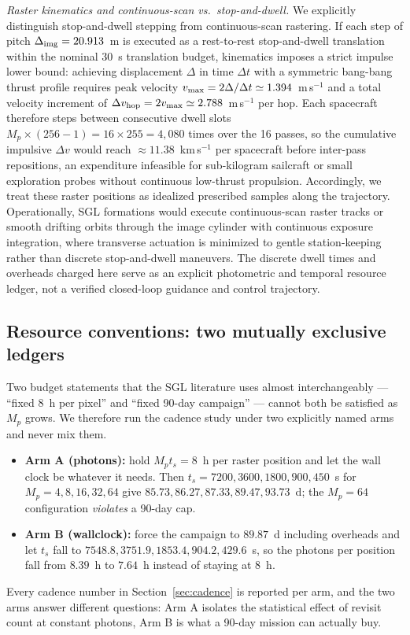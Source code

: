 \documentclass[twocolumn,10pt]{article}
\begin{document}
\emph{Raster kinematics and continuous-scan vs.\ stop-and-dwell.} We explicitly distinguish stop-and-dwell stepping from continuous-scan rastering. If each step of pitch $\Delta_{\rm img} = 20.913$~m is executed as a rest-to-rest stop-and-dwell translation within the nominal 30~s translation budget, kinematics imposes a strict impulse lower bound: achieving displacement $\Delta$ in time $\Delta t$ with a symmetric bang-bang thrust profile requires peak velocity $v_{\rm max} = 2\Delta/\Delta t \simeq 1.394$~m\,s$^{-1}$ and a total velocity increment of $\Delta v_{\rm hop} = 2 v_{\rm max} \simeq 2.788$~m\,s$^{-1}$ per hop. Each spacecraft therefore steps between consecutive dwell slots
$M_p\times(256-1)=16\times255=4{,}080$ times over the 16 passes, so the cumulative impulsive $\Delta v$ would reach $\approx 11.38$~km\,s$^{-1}$ per spacecraft before inter-pass repositions, an expenditure infeasible for sub-kilogram sailcraft or small exploration probes without continuous low-thrust propulsion. Accordingly, we treat these raster positions as idealized prescribed samples along the trajectory. Operationally, SGL formations would execute continuous-scan raster tracks or smooth drifting orbits through the image cylinder with continuous exposure integration, where transverse actuation is minimized to gentle station-keeping rather than discrete stop-and-dwell maneuvers. The discrete dwell times and overheads charged here serve as an explicit photometric and temporal resource ledger, not a verified closed-loop guidance and control trajectory.

\subsection{Resource conventions: two mutually exclusive ledgers}
\label{sec:ledger}
Two budget statements that the SGL literature uses almost interchangeably ---
``fixed 8~h per pixel'' and ``fixed 90-day campaign'' --- cannot both be
satisfied as $M_p$ grows. We therefore run the
cadence study under two explicitly named arms and never mix them.
\begin{itemize}
\item {\bf Arm A (photons):} hold $M_p t_s=8$~h per raster position and let the
wall clock be whatever it needs. Then $t_s=7200,3600,1800,900,450$~s for
$M_p=4,8,16,32,64$ give $85.73,86.27,87.33,89.47,\mathbf{93.73}$~d; the
$M_p=64$ configuration \emph{violates} a 90-day cap.
\item {\bf Arm B (wallclock):} force the campaign to $89.87$~d including
overheads and let $t_s$ fall to $7548.8,3751.9,1853.4,904.2,\mathbf{429.6}$~s,
so the photons per position fall from $8.39$~h to $7.64$~h instead of staying
at 8~h.
\end{itemize}
Every cadence number in Section~\ref{sec:cadence} is reported per arm, and the
two arms answer different questions: Arm A isolates the statistical effect of
revisit count at constant photons, Arm B is what a 90-day mission can actually
buy.
\end{document}
